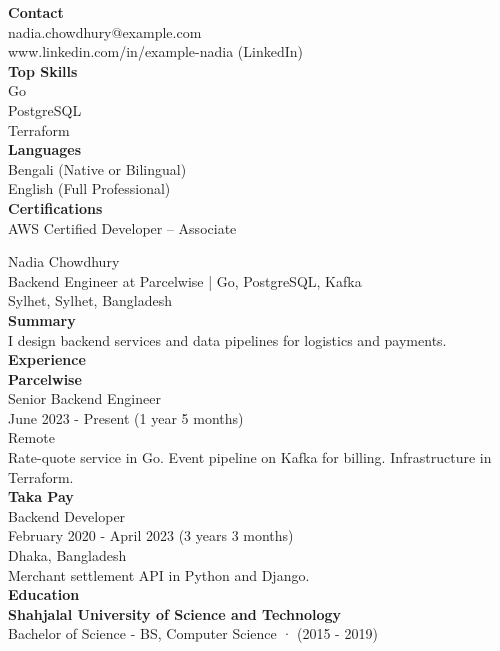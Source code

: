 \documentclass[10pt]{article}
\begin{document}
\noindent
\begin{minipage}[t]{0.28\textwidth}
\textbf{Contact}\\[2pt]
\small nadia.chowdhury@example.com\\
www.linkedin.com/in/example-nadia (LinkedIn)\\[8pt]
\normalsize\textbf{Top Skills}\\[2pt]
\small Go\\
PostgreSQL\\
Terraform\\[8pt]
\normalsize\textbf{Languages}\\[2pt]
\small Bengali (Native or Bilingual)\\
English (Full Professional)\\[8pt]
\normalsize\textbf{Certifications}\\[2pt]
\small AWS Certified Developer – Associate
\end{minipage}\hfill
\begin{minipage}[t]{0.66\textwidth}
{\LARGE Nadia Chowdhury}\\[4pt]
Backend Engineer at Parcelwise | Go, PostgreSQL, Kafka\\
\small Sylhet, Sylhet, Bangladesh\\[10pt]
\normalsize\textbf{Summary}\\[2pt]
\small I design backend services and data pipelines for logistics and payments.\\[10pt]
\normalsize\textbf{Experience}\\[4pt]
\textbf{Parcelwise}\\
\small Senior Backend Engineer\\
June 2023 - Present (1 year 5 months)\\
Remote\\
Rate-quote service in Go. Event pipeline on Kafka for billing. Infrastructure in Terraform.\\[8pt]
\normalsize\textbf{Taka Pay}\\
\small Backend Developer\\
February 2020 - April 2023 (3 years 3 months)\\
Dhaka, Bangladesh\\
Merchant settlement API in Python and Django.\\[10pt]
\normalsize\textbf{Education}\\[4pt]
\textbf{Shahjalal University of Science and Technology}\\
\small Bachelor of Science - BS, Computer Science · (2015 - 2019)
\end{minipage}
\end{document}
